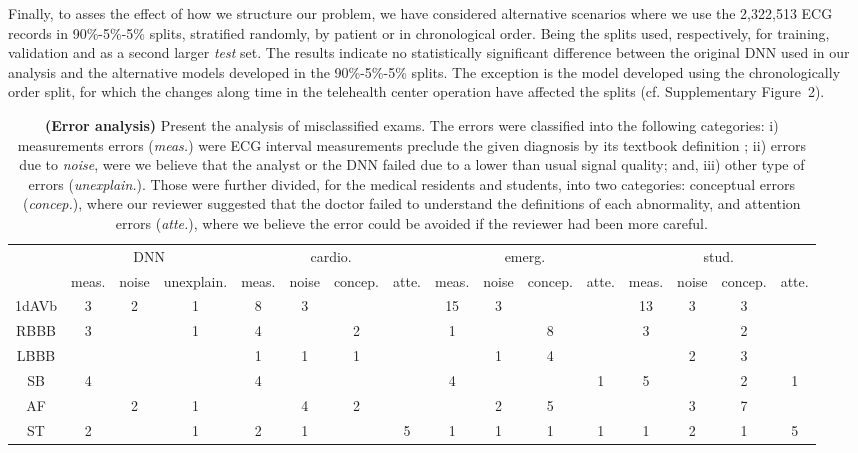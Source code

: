 \documentclass{article}
\begin{document}
Finally, to asses the effect of how we structure our problem, we have considered alternative scenarios where we use the 2,322,513 ECG records in 90\%-5\%-5\% splits, stratified randomly, by patient or in chronological order. Being the splits used, respectively, for training, validation and as a second larger \textit{test} set. The results indicate no  statistically significant difference between the original DNN used in our analysis and the alternative models developed in the 90\%-5\%-5\% splits. The exception is the model developed using the chronologically order split, for which the changes along time in the telehealth center operation have affected the splits (cf. Supplementary Figure~2).


\begin{table*}
    \setlength{\tabcolsep}{5pt}
    \renewcommand{\arraystretch}{1.0}
    \scriptsize
    \centering
    \begin {tabular}{c|ccc|cccc|cccc|cccc}\toprule \multicolumn {1}{c}{}& \multicolumn {3}{c}{DNN} & \multicolumn {4}{c}{cardio.} & \multicolumn {4}{c}{emerg.} & \multicolumn {4}{c}{stud.} \\&meas.&noise&unexplain.&meas.&noise&concep.&atte.&meas.&noise&concep.&atte.&meas.&noise&concep.&atte.\\\midrule 1dAVb& {3}& {2}& {1}& {8}& {3}&&& {15}& {3}&&& {13}& {3}& {3}&\\RBBB& {3}&& {1}& {4}&& {2}&& {1}&& {8}&& {3}&& {2}&\\LBBB&&&& {1}& {1}& {1}&&& {1}& {4}&&& {2}& {3}&\\SB& {4}&&& {4}&&&& {4}&&& {1}& {5}&& {2}& {1}\\AF&& {2}& {1}&& {4}& {2}&&& {2}& {5}&&& {3}& {7}&\\ST& {2}&& {1}& {2}& {1}&& {5}& {1}& {1}& {1}& {1}& {1}& {2}& {1}& {5}\\\bottomrule \end {tabular}\caption{\textbf{(Error analysis)} Present the analysis of misclassified exams. The errors were classified into the following categories: i) measurements errors (\textit{meas.}) were ECG interval measurements preclude the given diagnosis by its textbook definition ; ii) errors due to \textit{noise}, were we believe that the analyst or the DNN failed due to a lower than usual signal quality; and, iii) other type of errors (\textit{unexplain.}). Those were further divided, for the medical residents and students, into two categories: conceptual errors (\textit{concep.}), where our reviewer suggested that the doctor failed to understand the definitions of each abnormality, and attention errors (\textit{atte.}), where we believe the error could be avoided if the reviewer had been more careful.}
    \label{tab:error_analysis}
\end{table*}
\end{document}
